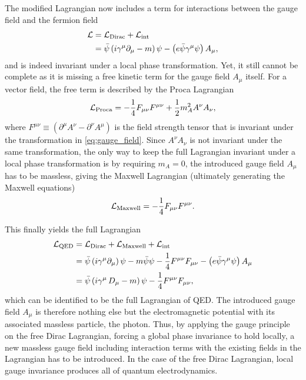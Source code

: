 The modified Lagrangian now includes a term for interactions between the gauge field and the fermion field
\begin{equation}
\begin{split}
	\mathcal{L} &= \mathcal{L}_\mathrm{Dirac} + \mathcal{L}_\mathrm{int} \\
		&= \bar{\psi}\left(i\gamma^\mu\partial_\mu - m\right)\psi - \left(e\bar{\psi}\gamma^\mu\psi\right)A_\mu,
	\label{eq:modified_lagrangian}
\end{split}
\end{equation}
and is indeed invariant under a local phase transformation. Yet, it still cannot be complete as it is missing a free kinetic term for the gauge field $A_\mu$ itself. For a vector field, the free term is described by the Proca Lagrangian
\begin{equation}
	\mathcal{L}_\mathrm{Proca} = -\frac{1}{4}F_{\mu\nu}F^{\mu\nu} + \frac{1}{2}m_A^2A^\nu A_\nu,
\end{equation}
where $F^{\mu\nu}\equiv\left(\partial^\mu A^\nu-\partial^\nu A^\mu\right)$ is the field strength tensor that is invariant under the transformation in \cref{eq:gauge_field}. Since $A^\nu A_\nu$ is not invariant under the same transformation, the only way to keep the full Lagrangian invariant under a local phase transformation is by requiring $m_A=0$, \ie the introduced gauge field $A_\mu$ has to be massless, giving the Maxwell Lagrangian (ultimately generating the Maxwell equations)
\begin{equation}
	\mathcal{L}_\mathrm{Maxwell} = -\frac{1}{4}F_{\mu\nu}F^{\mu\nu}.
\end{equation}

This finally yields the full Lagrangian
\begin{equation}
\begin{split}
		\mathcal{L}_\mathrm{QED} & = \mathcal{L}_\mathrm{Dirac} + \mathcal{L}_\mathrm{Maxwell} + \mathcal{L}_\mathrm{int} \\
	  				& = \bar{\psi}\left(i\gamma^\mu\partial_\mu\right)\psi - m\bar{\psi}\psi - \frac{1}{4}F^{\mu\nu}F_{\mu\nu} - \left(e\bar{\psi}\gamma^\mu\psi\right)A_\mu \\
					& = \bar{\psi}\left(i\gamma^\mu\mathop{}\!D_\mu - m\right)\psi - \frac{1}{4}F^{\mu\nu}F_{\mu\nu},
\end{split}
\end{equation}
which can be identified to be the full Lagrangian of QED. The introduced gauge field $A_\mu$ is therefore nothing else but the electromagnetic potential with its associated massless particle, the photon. Thus, by applying the gauge principle on the free Dirac Lagrangian, \ie forcing a global phase invariance to hold locally, a new massless gauge field including interaction terms with the existing fields in the Lagrangian has to be introduced. In the case of the free Dirac Lagrangian, local gauge invariance produces all of quantum electrodynamics.

